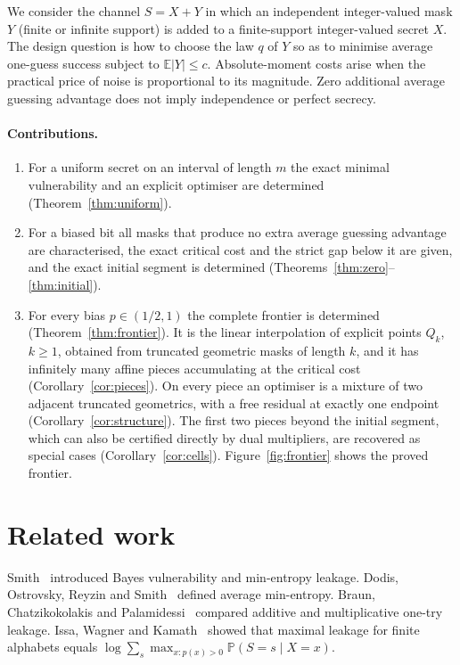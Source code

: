 \documentclass{article}
\theoremstyle{definition}
\theoremstyle{remark}
\newcommand{\E}{\mathbb{E}}
\newcommand{\Prob}{\mathbb{P}}
\begin{document}
We consider the channel \(S=X+Y\) in which an independent integer-valued mask \(Y\) (finite or infinite support) is added to a finite-support integer-valued secret \(X\). The design question is how to choose the law \(q\) of \(Y\) so as to minimise average one-guess success subject to \(\E|Y|\le c\). Absolute-moment costs arise when the practical price of noise is proportional to its magnitude. Zero additional average guessing advantage does not imply independence or perfect secrecy.

\paragraph{Contributions.}
\begin{enumerate}
\item For a uniform secret on an interval of length \(m\) the exact minimal vulnerability and an explicit optimiser are determined (Theorem~\ref{thm:uniform}).
\item For a biased bit all masks that produce no extra average guessing advantage are characterised, the exact critical cost and the strict gap below it are given, and the exact initial segment is determined (Theorems~\ref{thm:zero}--\ref{thm:initial}).
\item For every bias \(p\in(1/2,1)\) the complete frontier is determined (Theorem~\ref{thm:frontier}). It is the linear interpolation of explicit points \(Q_k\), \(k\ge1\), obtained from truncated geometric masks of length \(k\), and it has infinitely many affine pieces accumulating at the critical cost (Corollary~\ref{cor:pieces}). On every piece an optimiser is a mixture of two adjacent truncated geometrics, with a free residual at exactly one endpoint (Corollary~\ref{cor:structure}). The first two pieces beyond the initial segment, which can also be certified directly by dual multipliers, are recovered as special cases (Corollary~\ref{cor:cells}). Figure~\ref{fig:frontier} shows the proved frontier.
\end{enumerate}

\section{Related work}
Smith~\cite{Smith09} introduced Bayes vulnerability and min-entropy leakage. Dodis, Ostrovsky, Reyzin and Smith~\cite{DORS08} defined average min-entropy. Braun, Chatzikokolakis and Palamidessi~\cite{BCP09} compared additive and multiplicative one-try leakage. Issa, Wagner and Kamath~\cite{IWK20} showed that maximal leakage for finite alphabets equals \(\log\sum_s\max_{x:p(x)>0}\Prob(S=s\mid X=x)\).
\end{document}
